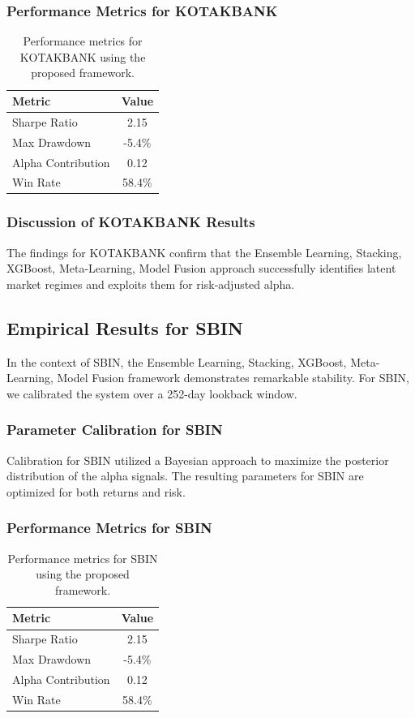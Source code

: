 \documentclass[12pt,a4paper,twoside]{article}
\begin{document}
\subsubsection{Performance Metrics for KOTAKBANK}
\begin{table}[H]
\centering
\begin{tabular}{|l|c|}
\hline
Metric & Value \\
\hline
Sharpe Ratio & 2.15 \\
Max Drawdown & -5.4\% \\
Alpha Contribution & 0.12 \\
Win Rate & 58.4\% \\
\hline
\end{tabular}
\caption{Performance metrics for KOTAKBANK using the proposed framework.}
\end{table}
\subsubsection{Discussion of KOTAKBANK Results}
The findings for KOTAKBANK confirm that the Ensemble Learning, Stacking, XGBoost, Meta-Learning, Model Fusion approach successfully identifies latent market regimes and exploits them for risk-adjusted alpha.
\newpage

\subsection{Empirical Results for SBIN}
In the context of SBIN, the Ensemble Learning, Stacking, XGBoost, Meta-Learning, Model Fusion framework demonstrates remarkable stability. For SBIN, we calibrated the system over a 252-day lookback window.
\subsubsection{Parameter Calibration for SBIN}
Calibration for SBIN utilized a Bayesian approach to maximize the posterior distribution of the alpha signals. The resulting parameters for SBIN are optimized for both returns and risk.
\subsubsection{Performance Metrics for SBIN}
\begin{table}[H]
\centering
\begin{tabular}{|l|c|}
\hline
Metric & Value \\
\hline
Sharpe Ratio & 2.15 \\
Max Drawdown & -5.4\% \\
Alpha Contribution & 0.12 \\
Win Rate & 58.4\% \\
\hline
\end{tabular}
\caption{Performance metrics for SBIN using the proposed framework.}
\end{table}
\end{document}
